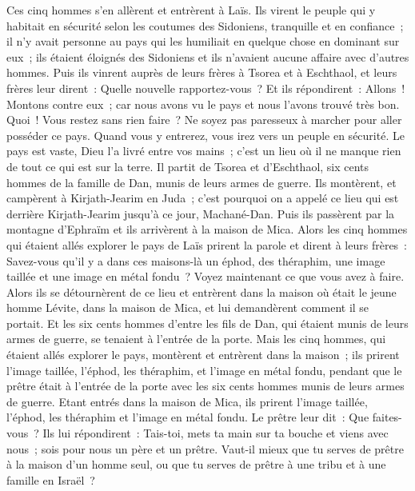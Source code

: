 \begin{multicols}{2}
Ces cinq hommes s'en allèrent et entrèrent à Laïs. Ils virent le peuple qui y habitait en sécurité selon les coutumes des Sidoniens, tranquille et en confiance~; il n'y avait personne au pays qui les humiliait en quelque chose en dominant sur eux~; ils étaient éloignés des Sidoniens et ils n'avaient aucune affaire avec d'autres hommes.
Puis ils vinrent auprès de leurs frères à Tsorea et à Eschthaol, et leurs frères leur dirent~: Quelle nouvelle rapportez-vous~?
Et ils répondirent~: Allons~! Montons contre eux~; car nous avons vu le pays et nous l'avons trouvé très bon. Quoi~! Vous restez sans rien faire~? Ne soyez pas paresseux à marcher pour aller posséder ce pays.
Quand vous y entrerez, vous irez vers un peuple en sécurité. Le pays est vaste, Dieu l'a livré entre vos mains~; c'est un lieu où il ne manque rien de tout ce qui est sur la terre.
Il partit de Tsorea et d'Eschthaol, six cents hommes de la famille de Dan, munis de leurs armes de guerre.
Ils montèrent, et campèrent à Kirjath-Jearim en Juda~; c'est pourquoi on a appelé ce lieu qui est derrière Kirjath-Jearim jusqu'à ce jour, Machané-Dan.
Puis ils passèrent par la montagne d'Ephraïm et ils arrivèrent à la maison de Mica.
Alors les cinq hommes qui étaient allés explorer le pays de Laïs prirent la parole et dirent à leurs frères~: Savez-vous qu'il y a dans ces maisons-là un éphod, des théraphim, une image taillée et une image en métal fondu~? Voyez maintenant ce que vous avez à faire.
Alors ils se détournèrent de ce lieu et entrèrent dans la maison où était le jeune homme Lévite, dans la maison de Mica, et lui demandèrent comment il se portait.
Et les six cents hommes d'entre les fils de Dan, qui étaient munis de leurs armes de guerre, se tenaient à l'entrée de la porte.
Mais les cinq hommes, qui étaient allés explorer le pays, montèrent et entrèrent dans la maison~; ils prirent l'image taillée, l'éphod, les théraphim, et l'image en métal fondu, pendant que le prêtre était à l'entrée de la porte avec les six cents hommes munis de leurs armes de guerre.
Etant entrés dans la maison de Mica, ils prirent l'image taillée, l'éphod, les théraphim et l'image en métal fondu. Le prêtre leur dit~: Que faites-vous~?
Ils lui répondirent~: Tais-toi, mets ta main sur ta bouche et viens avec nous~; sois pour nous un père et un prêtre. Vaut-il mieux que tu serves de prêtre à la maison d'un homme seul, ou que tu serves de prêtre à une tribu et à une famille en Israël~?

\end{multicols}
